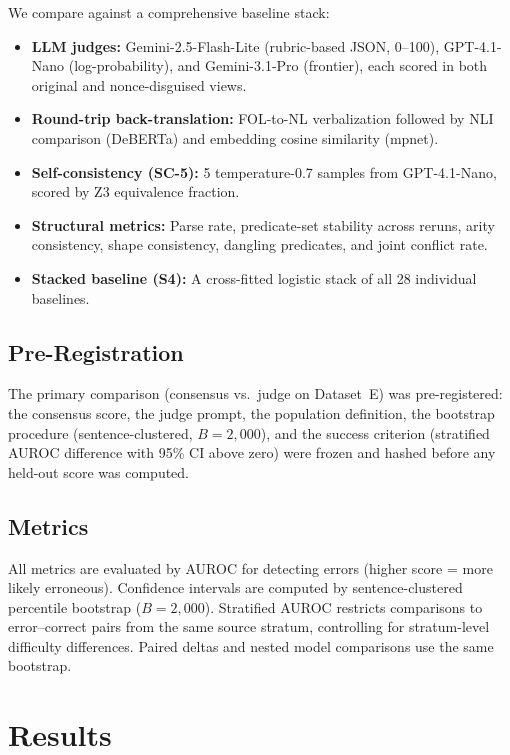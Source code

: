 \documentclass[11pt,letterpaper]{article}
\begin{document}
We compare against a comprehensive baseline stack:

\begin{itemize}
  \item \textbf{LLM judges:} Gemini-2.5-Flash-Lite (rubric-based JSON, 0--100), GPT-4.1-Nano (log-probability), and Gemini-3.1-Pro (frontier), each scored in both original and nonce-disguised views.
  \item \textbf{Round-trip back-translation:} FOL-to-NL verbalization followed by NLI comparison (DeBERTa) and embedding cosine similarity (mpnet).
  \item \textbf{Self-consistency (SC-5):} 5 temperature-0.7 samples from GPT-4.1-Nano, scored by Z3 equivalence fraction.
  \item \textbf{Structural metrics:} Parse rate, predicate-set stability across reruns, arity consistency, shape consistency, dangling predicates, and joint conflict rate.
  \item \textbf{Stacked baseline (S4):} A cross-fitted logistic stack of all 28 individual baselines.
\end{itemize}

\subsection{Pre-Registration}

The primary comparison (consensus vs.\ judge on Dataset~E) was pre-registered: the consensus score, the judge prompt, the population definition, the bootstrap procedure (sentence-clustered, $B = 2{,}000$), and the success criterion (stratified AUROC difference with 95\% CI above zero) were frozen and hashed before any held-out score was computed.

\subsection{Metrics}

All metrics are evaluated by AUROC for detecting errors (higher score = more likely erroneous). Confidence intervals are computed by sentence-clustered percentile bootstrap ($B = 2{,}000$). Stratified AUROC restricts comparisons to error--correct pairs from the same source stratum, controlling for stratum-level difficulty differences. Paired deltas and nested model comparisons use the same bootstrap.


\section{Results}
\label{sec:results}
\end{document}

